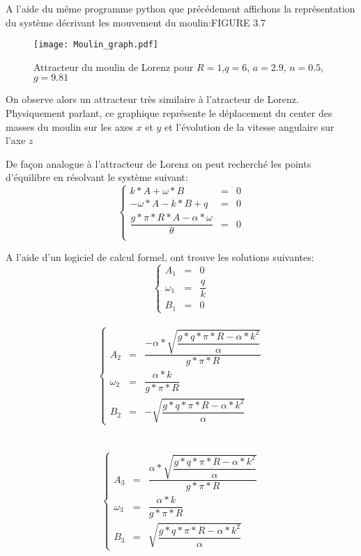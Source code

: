 A l'aide du même programme python que précédement affichons la représentation du système décrivant les mouvement du moulin:FIGURE 3.7

\begin{figure}
    \texttt{[image: Moulin\_graph.pdf]}
    \caption{Attracteur du moulin de Lorenz pour $R=1$,$q=6$, $a=2.9$, $n=0.5$, $g=9.81$ } 
\end{figure}

On observe alors un attracteur très similaire à l'atracteur de Lorenz. Physiquement parlant, ce graphique représente le déplacement du center des masses du moulin sur les axes $x$ et $y$ et l'évolution de la vitesse angulaire sur l'axe $z$

De façon analogue à l'attracteur de Lorenz on peut recherché les points d'équilibre en résolvant le système suivant:
\[
    \left\{
    \begin{array}{rcl}
        k*A+\omega*B&=&0\\
        -\omega*A-k*B+q&=&0\\
        \dfrac{g*\pi*R*A-\alpha*\omega}{\theta }&=&0\\
    \end{array}
    \right.
\]

A l'aide d'un logiciel de calcul formel, ont trouve les solutions suivantes:
\[
    \left\{
    \begin{array}{rcl}
        A_1&=&0\\
        \omega_1&=&\dfrac{q}{k}\\
        B_1&=&0

    \end{array}
    \right.
\]\\

\[
    \left\{
    \begin{array}{rcl}
        A_2&=&\dfrac{-\alpha*\sqrt{\dfrac{g*q*\pi*R-\alpha*k^2}{\alpha}}}{g*\pi*R}\\
        \omega_2&=&\dfrac{\alpha*k}{g*\pi*R}\\
        B_2&=&-\sqrt{\dfrac{g*q*\pi*R-\alpha*k^2}{\alpha}}

    \end{array}
    \right.
\]\\
\\
\[
    \left\{
    \begin{array}{rcl}
        A_3&=&\dfrac{\alpha*\sqrt{\dfrac{g*q*\pi*R-\alpha*k^2}{\alpha}}}{g*\pi*R}\\
        \omega_3&=&\dfrac{\alpha*k}{g*\pi*R}\\
        B_3&=&\sqrt{\dfrac{g*q*\pi*R-\alpha*k^2}{\alpha}}

    \end{array}
    \right.
\]\\

